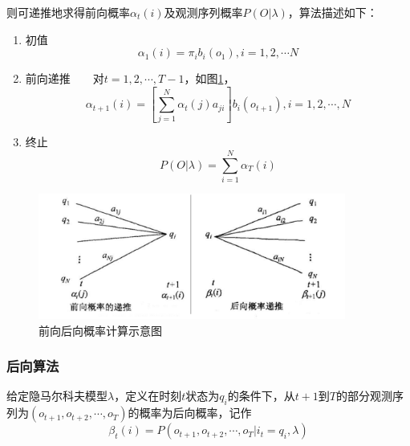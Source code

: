         则可递推地求得前向概率${\alpha _t}(i)$及观测序列概率$P(O|\lambda )$，算法描述如下：
        \begin{enumerate}
            \item 初值
                \begin{equation}
                    {\alpha _1}(i) = {\pi _i}{b_i}({o_1}),i = 1,2, \cdots N
                \end{equation}
            \item 前向递推~~~~对$t = 1,2, \cdots ,T - 1$，如图\ref{fig:forback}，
                \begin{equation}
                    {\alpha _{t + 1}}(i) = \left[ {\sum\limits_{j = 1}^N {{\alpha _t}(j){a_{ji}}} } \right]{b_i}({o_{t + 1}}),i = 1,2, \cdots ,N
                \end{equation}
            \item 终止
                \begin{equation}
                    P(O|\lambda ) = \sum\limits_{i = 1}^N {{\alpha _T}(i)}
                \end{equation}
        \end{enumerate}

        \begin{figure}
        \centering
        \includegraphics[width=0.9\textwidth]{figures/chapter2/forback}
        \caption{前向后向概率计算示意图}
        \label{fig:forback}
        \end{figure}

        \subsubsection{后向算法}
        \begin{definition}[后向算法]
         给定隐马尔科夫模型$\lambda$，定义在时刻$t$状态为$q_i$的条件下，从$t+1$到$T$的部分观测序列为$({o_{t+1}},{o_{t+2}},\cdots,{o_T})$的概率为后向概率，记作
             \begin{equation}
                 {\beta _t}(i) = P({o_{t + 1}},{o_{t + 2}}, \cdots ,{o_T}|{i_t} = {q_i},\lambda )
             \end{equation}
        \end{definition}

